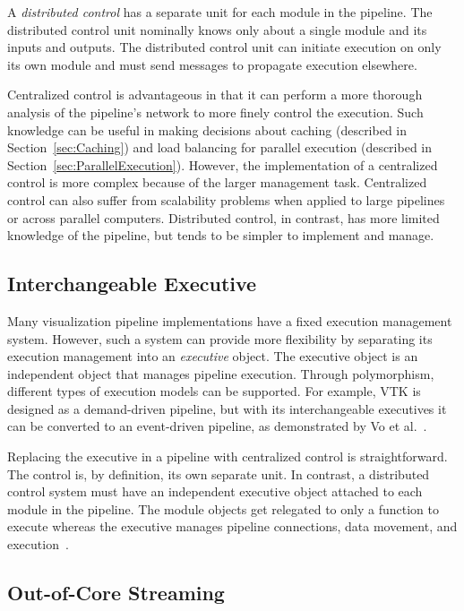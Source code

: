 \documentclass[journal,twocolumn,10pt,letterpaper,twoside]{IEEEtran}
\newcommand*{\lcite}[1]{~\cite{#1}}
\newcommand*{\scite}[1]{~\cite{#1}}
\newcommand*{\keyterm}[1]{\emph{#1}}
\newcommand{\etal}{et al.}
\begin{document}
A \keyterm{distributed control} has a separate unit for each module in
the pipeline.  The distributed control unit nominally knows only about a
single module and its inputs and outputs.  The distributed control unit
can initiate execution on only its own module and must send messages to
propagate execution elsewhere.

Centralized control is advantageous in that it can perform a more thorough
analysis of the pipeline's network to more finely control the execution.
Such knowledge can be useful in making decisions about caching (described
in Section~\ref{sec:Caching}) and load balancing for parallel execution
(described in Section~\ref{sec:ParallelExecution}).  However, the
implementation of a centralized control is more complex because of the
larger management task.  Centralized control can also suffer from
scalability problems when applied to large pipelines or across parallel
computers.  Distributed control, in contrast, has more limited knowledge of
the pipeline, but tends to be simpler to implement and manage.

\subsection{Interchangeable Executive}
\label{sec:InterchangeableExecutive}

Many visualization pipeline implementations have a fixed execution
management system.  However, such a system can provide more flexibility by
separating its execution management into an \keyterm{executive} object.  The
executive object is an independent object that manages pipeline execution.
Through polymorphism, different types of execution models can be
supported.  For example, VTK is designed as a demand-driven pipeline, but
with its interchangeable executives it can be converted to an event-driven
pipeline, as demonstrated by Vo \etal\scite{Vo2010}.

Replacing the executive in a pipeline with centralized control is
straightforward.  The control is, by definition, its own separate unit.  In
contrast, a distributed control system must have an independent executive
object attached to each module in the pipeline.  The module objects
get relegated to only a function to execute whereas the executive manages
pipeline connections, data movement, and execution\lcite{VTKUsersGuide}.

\subsection{Out-of-Core Streaming}
\label{sec:OutOfCore}
\end{document}
